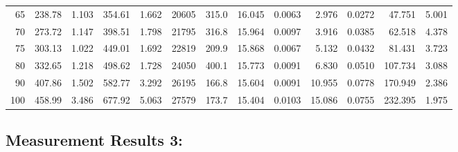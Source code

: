 \documentclass[10pt]{article}
\begin{document}
{\begin{tabular}{|r|rr|rr|rr|rr|rr|r|r|}
       65 &       238.78 &        1.103 &       354.61 &        1.662 &        20605 &        315.0 &       16.045 &       0.0063 &        2.976 &       0.0272 &       47.751 &        5.001 \\
       70 &       273.72 &        1.147 &       398.51 &        1.798 &        21795 &        316.8 &       15.964 &       0.0097 &        3.916 &       0.0385 &       62.518 &        4.378 \\
       75 &       303.13 &        1.022 &       449.01 &        1.692 &        22819 &        209.9 &       15.868 &       0.0067 &        5.132 &       0.0432 &       81.431 &        3.723 \\
       80 &       332.65 &        1.218 &       498.62 &        1.728 &        24050 &        400.1 &       15.773 &       0.0091 &        6.830 &       0.0510 &      107.734 &        3.088 \\
       90 &       407.86 &        1.502 &       582.77 &        3.292 &        26195 &        166.8 &       15.604 &       0.0091 &       10.955 &       0.0778 &      170.949 &        2.386 \\
      100 &       458.99 &        3.486 &       677.92 &        5.063 &        27579 &        173.7 &       15.404 &       0.0103 &       15.086 &       0.0755 &      232.395 &        1.975 \\
\hline
\end{tabular}
}



\subsection*{\large \bf Measurement Results 3:}
\end{document}
